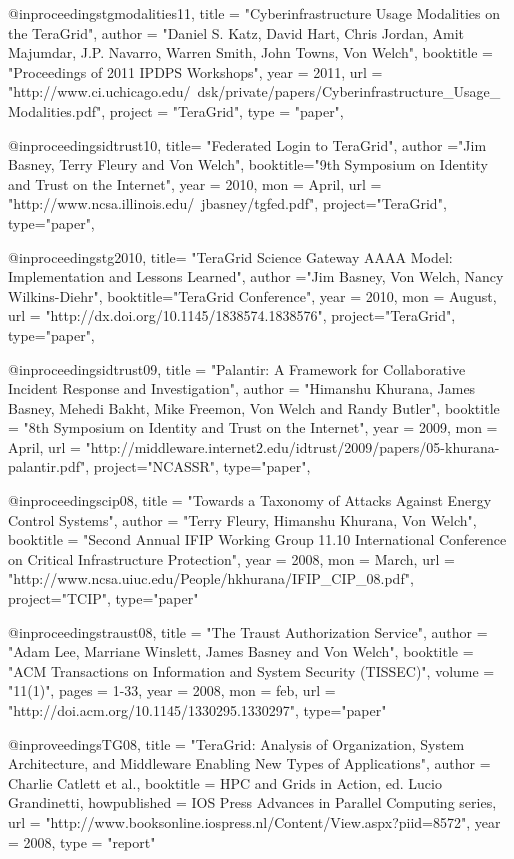 
@inproceedings{tgmodalities11,
title = "Cyberinfrastructure Usage Modalities on the TeraGrid",
author = "Daniel S. Katz, David Hart, Chris Jordan, Amit Majumdar, J.P. Navarro, Warren Smith, John Towns, Von Welch",
booktitle = "Proceedings of 2011 IPDPS Workshops",
year = {2011},
url = "http://www.ci.uchicago.edu/~dsk/private/papers/Cyberinfrastructure_Usage_Modalities.pdf",
project = "TeraGrid",
type = "paper",
}

@inproceedings{idtrust10,
title= "Federated Login to TeraGrid",
author ="Jim Basney, Terry Fleury and Von Welch",
booktitle="9th Symposium on Identity and Trust on the Internet",
year = {2010},
mon = {April},
url = "http://www.ncsa.illinois.edu/~jbasney/tgfed.pdf",
project="TeraGrid",
type="paper",
}

@inproceedings{tg2010,
title= "TeraGrid Science Gateway AAAA Model: Implementation and Lessons Learned",
author ="Jim Basney, Von Welch, Nancy Wilkins-Diehr",
booktitle="TeraGrid Conference",
year = {2010},
mon = {August},
url = "http://dx.doi.org/10.1145/1838574.1838576",
project="TeraGrid",
type="paper",
}

@inproceedings{idtrust09,
title = "Palantir: A Framework for Collaborative Incident Response and Investigation",
author = "Himanshu Khurana, James Basney, Mehedi Bakht, Mike Freemon, Von Welch and Randy Butler",
booktitle = "8th Symposium on Identity and Trust on the Internet",
year = {2009},
mon = {April},
url = "http://middleware.internet2.edu/idtrust/2009/papers/05-khurana-palantir.pdf",
project="NCASSR",
type="paper",
}

@inproceedings{cip08,
title   = "Towards a Taxonomy of Attacks Against Energy Control Systems",
author = "Terry Fleury, Himanshu Khurana, Von Welch",
booktitle = "Second Annual IFIP Working Group 11.10 International Conference on Critical Infrastructure Protection",
year = {2008},
mon = {March},
url = "http://www.ncsa.uiuc.edu/People/hkhurana/IFIP_CIP_08.pdf",
project="TCIP",
type="paper"
}

@inproceedings{traust08,
title   = "The {T}raust Authorization Service",
author = "Adam Lee, Marriane Winslett, James Basney and Von Welch",
booktitle = "ACM Transactions on Information and System Security (TISSEC)",
volume = "11(1)",
pages = {1-33}, 
year = {2008},
mon = feb,
url = "http://doi.acm.org/10.1145/1330295.1330297",
type="paper"
}

@inproveedings{TG08,
title = "TeraGrid: Analysis of Organization, System Architecture, and Middleware Enabling New Types of Applications",
author = {Charlie Catlett et al.},
booktitle = {HPC and Grids in Action, ed. Lucio Grandinetti},
howpublished = {IOS Press Advances in Parallel Computing series},
url = "http://www.booksonline.iospress.nl/Content/View.aspx?piid=8572",
year = {2008},
type = "report"
}


